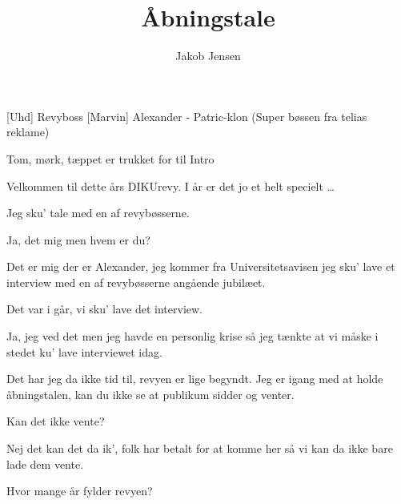 \documentclass[a4paper]{article}
\title{Åbningstale}
\author{Jakob Jensen}
\begin{document}
\maketitle

\begin{roles}
[Uhd] Revyboss
[Marvin] Alexander - Patric-klon (Super bøssen fra telias reklame)
\end{roles}

\begin{props}
\end{props}

\begin{sketch}
  
  \scene Tom, mørk, tæppet er trukket for til Intro
  
   Velkommen til dette års
  DIKUrevy. I år er det jo et helt specielt \ldots{}
  
  
  
   Jeg sku' tale med en
  af revybøsserne.
  
   Ja, det mig men hvem er du?
  
   Det er mig der er Alexander, jeg kommer fra
  Universitetsavisen jeg sku' lave et interview med en af revybøsserne
  angående jubilæet.
  
   Det var i går, vi sku' lave det
  interview.
  
   Ja, jeg ved det men jeg havde en personlig krise så jeg
  tænkte at vi måske i stedet ku' lave interviewet idag.
  
   Det har jeg da ikke tid til, revyen er lige
  begyndt. Jeg er igang med at holde åbningstalen, kan du ikke se at
  publikum sidder og venter.
  
   Kan det ikke vente?
  
   Nej det kan det da ik', folk har betalt for at komme her så
  vi kan da ikke bare lade dem vente.
  
   Hvor mange år fylder revyen?
  

\end{sketch}
\end{document}
